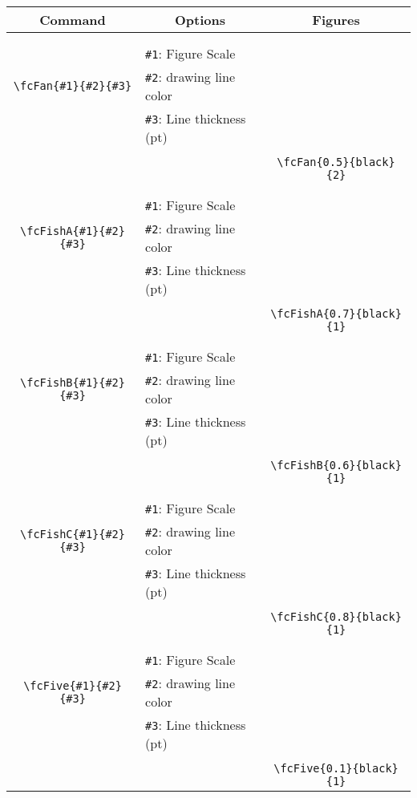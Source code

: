\documentclass{article}
\begin{document}
\begin{table}[H]\centering\begin{tabular}{|c|l|c|}\hline {\bf Command}& \multicolumn{1}{c|}{{\bf Options}} & {\bf Figures}\\  \hline	&&\multirow{5}{*}{\fcFan{0.5}{black}{2}}\\	&&\\	&\verb|#1|: Figure Scale &\\	\verb|\fcFan{#1}{#2}{#3}|&	\verb|#2|: drawing line color &\\	&\verb|#3|: Line thickness (pt) &\\ &&\\&&	\verb|\fcFan{0.5}{black}{2}|\\\hline 	
	&&\multirow{5}{*}{\fcFishA{0.7}{black}{1}}\\	&&\\	&\verb|#1|: Figure Scale &\\	\verb|\fcFishA{#1}{#2}{#3}|&	\verb|#2|: drawing line color &\\	&\verb|#3|: Line thickness (pt) &\\ &&\\&&	\verb|\fcFishA{0.7}{black}{1}|\\\hline 	
	&&\multirow{5}{*}{\fcFishB{0.6}{black}{1}}\\	&&\\	&\verb|#1|: Figure Scale &\\	\verb|\fcFishB{#1}{#2}{#3}|&	\verb|#2|: drawing line color &\\	&\verb|#3|: Line thickness (pt) &\\ &&\\&&	\verb|\fcFishB{0.6}{black}{1}|\\\hline 	
	&&\multirow{5}{*}{\fcFishC{0.8}{black}{1}}\\	&&\\	&\verb|#1|: Figure Scale &\\	\verb|\fcFishC{#1}{#2}{#3}|&	\verb|#2|: drawing line color &\\	&\verb|#3|: Line thickness (pt) &\\ &&\\&&	\verb|\fcFishC{0.8}{black}{1}|\\\hline 	
	&&\multirow{5}{*}{\fcFive{0.1}{black}{1}}\\	&&\\	&\verb|#1|: Figure Scale &\\	\verb|\fcFive{#1}{#2}{#3}|&	\verb|#2|: drawing line color &\\	&\verb|#3|: Line thickness (pt) &\\ &&\\&&	\verb|\fcFive{0.1}{black}{1}|\\\hline 	

\end{tabular}
\end{table}
\end{document}
